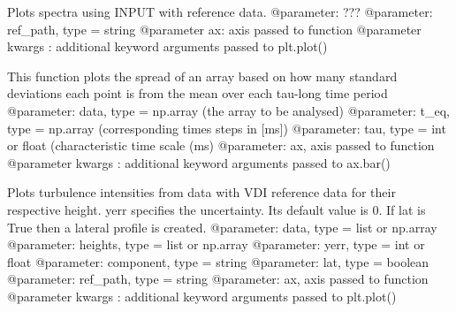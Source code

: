 \documentclass[letterpaper,10pt,english]{sphinxmanual}
\begin{document}

\begin{fulllineitems}
\label{\detokenize{index:windtunnel.plot_spectra}}
Plots spectra using INPUT with reference data.
@parameter: ???
@parameter: ref\_path, type = string
@parameter ax: axis passed to function
@parameter kwargs : additional keyword arguments passed to plt.plot()

\end{fulllineitems}


\begin{fulllineitems}
\label{\detokenize{index:windtunnel.plot_stdevs}}
This function plots the spread of an array based on how many standard 
deviations each point is from the mean over each tau-long time period
@parameter: data, type = np.array (the array to be analysed)
@parameter: t\_eq, type = np.array (corresponding times steps in {[}ms{]})
@parameter: tau, type = int or float (characteristic time scale (ms)
@parameter: ax, axis passed to function
@parameter kwargs : additional keyword arguments passed to ax.bar()

\end{fulllineitems}


\begin{fulllineitems}
\label{\detokenize{index:windtunnel.plot_turb_int}}
Plots turbulence intensities from data with VDI reference data for 
their respective height. yerr specifies the uncertainty. Its default value
is 0. If lat is True then a lateral profile is created.
@parameter: data, type = list or np.array
@parameter: heights, type = list or np.array
@parameter: yerr, type = int or float
@parameter: component, type = string
@parameter: lat, type = boolean
@parameter: ref\_path, type = string
@parameter: ax, axis passed to function    
@parameter kwargs : additional keyword arguments passed to plt.plot()

\end{fulllineitems}
\end{document}
